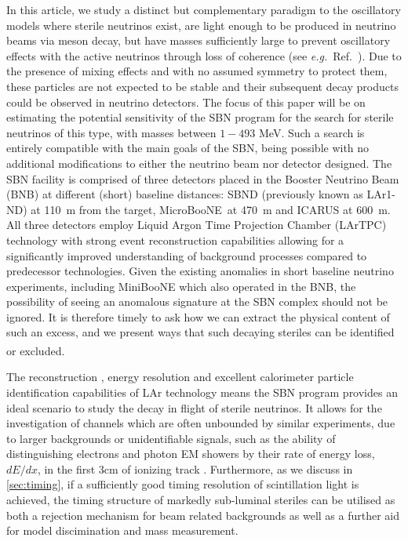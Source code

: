 \documentclass[11pt, a4paper]{article}
\newcommand{\refref}[1]{Ref.~\cite{#1}}
\def\eg{\emph{e.g.}}
\def\muboone{MicroBooNE}
\newcounter{CommentCount}
\newcommand{\marcom}[2]{\textsuperscript{\textcolor{#1}{\theCommentCount}}\marginpar{\textsuperscript{\textcolor{#1}{\theCommentCount}}\textcolor{#1}{{\small#1: #2}}}\stepcounter{CommentCount}}
\begin{document}
In this article, we study a distinct but complementary paradigm to the
oscillatory models where sterile neutrinos exist, are light enough to be
produced in neutrino beams via meson decay, but have masses sufficiently large
to prevent oscillatory effects with the active neutrinos through loss of
coherence (see \eg\ \refref{Akhmedov:2009rb}). Due to the presence of mixing
effects and with no assumed symmetry to protect them, these particles are not expected to be stable and their subsequent
decay products could be observed in neutrino detectors.
%
%
The focus of this paper will be on estimating the potential sensitivity of the
SBN program for the search for sterile neutrinos of this type, with masses
between $1-493$ MeV. Such a search is entirely compatible with the main goals of the SBN, being possible with no additional modifications to either the neutrino beam nor detector designed. 
%
The SBN facility is comprised of three detectors placed in the Booster Neutrino
Beam (BNB) at different (short) baseline distances: SBND (previously known as
LAr1-ND) at 110~m from the target, \muboone\ at 470~m and ICARUS at 600~m.  All
three detectors employ Liquid Argon Time Projection Chamber (LArTPC) technology
\cite{Rubbia:1977} with strong event reconstruction capabilities allowing for a
significantly improved understanding of background processes compared to
predecessor technologies. 
%
%
Given the existing anomalies in short baseline neutrino experiments, including
MiniBooNE which also operated in the BNB, the possibility of seeing an
anomalous signature at the SBN complex should not be ignored. It is therefore
timely to ask how we can extract the physical content of such an excess, and we
present ways that such decaying steriles can be identified or excluded.
\marcom{PB}{Delete the last 2 sentences?}

The reconstruction \cite{Church:2013hea, Marshall:2015rfa}, energy resolution
\cite{Sorel:2014rka} and excellent calorimeter particle identification
capabilities of LAr \cite{Antonello:2012hu} technology means the SBN program
provides an ideal scenario to study the decay in flight of sterile neutrinos.
It allows for the investigation of channels which are often unbounded by
similar experiments, due to larger backgrounds or unidentifiable signals, such
as the ability of distinguishing electrons and photon EM showers by their rate
of energy loss, $dE/dx$, in the first 3cm of ionizing track \cite{szelc:2007}.
Furthermore, as we discuss in \ref{sec:timing}, if a sufficiently good timing
resolution of scintillation light is achieved, the timing structure of markedly
sub-luminal steriles can be utilised as both a rejection mechanism for beam
related backgrounds as well as a further aid for model discimination and mass
measurement.
\end{document}
